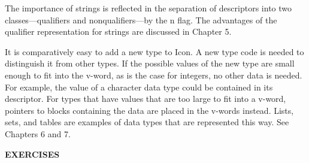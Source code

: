 The importance of strings is reflected in the separation of
descriptors into two classes---qualifiers and nonqualifiers---by the n
flag. The advantages of the qualifier representation for strings are
discussed in Chapter 5.

It is comparatively easy to add a new type to Icon. A new type code is
needed to distinguish it from other types. If the possible values of
the new type are small enough to fit into the v-word, as is the case
for integers, no other data is needed. For example, the value of a
character data type could be contained in its descriptor. For types
that have values that are too large to fit into a v-word, pointers to
blocks containing the data are placed in the v-words instead. Lists,
sets, and tables are examples of data types that are represented this
way. See Chapters 6 and 7.

{\sffamily\bfseries
EXERCISES}

